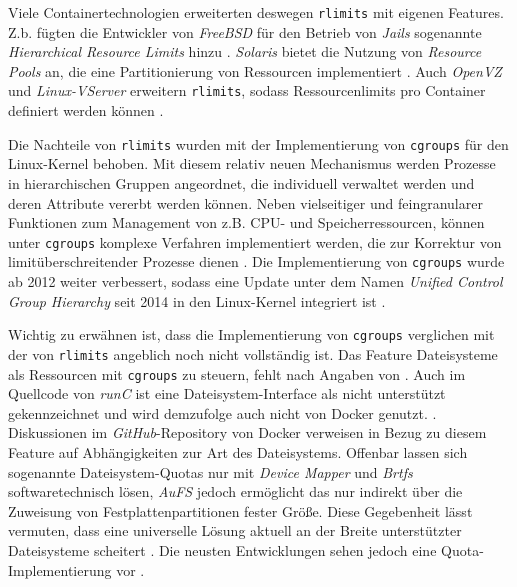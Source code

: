 \documentclass[../main.tex]{subfiles}
\begin{document}

		Viele Containertechnologien erweiterten deswegen \texttt{\acrshort{rlimits}} mit eigenen Features. Z.b. fügten die Entwickler von \emph{FreeBSD} für den Betrieb von \emph{Jails} sogenannte \emph{Hierarchical Resource Limits} hinzu \cite{freeBsdRCTL}. \emph{Solaris} bietet die Nutzung von \emph{Resource Pools} an, die eine Partitionierung von Ressourcen implementiert \cite{cgroupsUniHierarchyDoc}. Auch \emph{OpenVZ} und \emph{Linux-VServer} erweitern \texttt{\acrshort{rlimits}}, sodass Ressourcenlimits pro Container definiert werden können \cite[S.15+16]{dockerSec2}.

		Die Nachteile von \texttt{\acrshort{rlimits}} wurden mit der Implementierung von \texttt{\acrshort{cgroups}} für den Linux-Kernel behoben. Mit diesem relativ neuen Mechanismus werden Prozesse in hierarchischen Gruppen angeordnet, die individuell verwaltet werden und deren Attribute vererbt werden können. Neben vielseitiger und feingranularer Funktionen zum Management von z.B. \acrshort{CPU}- und Speicherressourcen, können unter \texttt{\acrshort{cgroups}} komplexe Verfahren implementiert werden, die zur Korrektur von limitüberschreitender Prozesse dienen \cite{cgroupsRedhat}. Die Implementierung von \texttt{\acrshort{cgroups}} wurde ab 2012 weiter verbessert, sodass eine Update unter dem Namen \emph{Unified Control Group Hierarchy} seit 2014 in den Linux-Kernel integriert ist \cite{cgroupsFixing}\cite{cgroupsUniHierarchy}.

		Wichtig zu erwähnen ist, dass die Implementierung von \texttt{\acrshort{cgroups}} verglichen mit der von \texttt{\acrshort{rlimits}} angeblich noch nicht vollständig ist. Das Feature Dateisysteme als Ressourcen mit \texttt{\acrshort{cgroups}} zu steuern, fehlt nach Angaben von \cite[S.19]{dockerSec2}. Auch im Quellcode von \emph{runC} ist eine Dateisystem-Interface als \glqq{}nicht unterstützt\grqq{} gekennzeichnet und wird demzufolge auch nicht von Docker genutzt. \cite{githubRunCCgroups}. Diskussionen im \emph{GitHub}-Repository von Docker verweisen in Bezug zu diesem Feature auf Abhängigkeiten zur Art des Dateisystems. Offenbar lassen sich sogenannte Dateisystem-Quotas nur mit \emph{Device Mapper} und \emph{Brtfs} softwaretechnisch lösen, \emph{AuFS} jedoch ermöglicht das nur indirekt über die Zuweisung von Festplattenpartitionen fester Größe. Diese Gegebenheit lässt vermuten, dass eine universelle Lösung aktuell an der Breite unterstützter Dateisysteme scheitert \cite{githubDockerIssueFsQuota}. Die neusten Entwicklungen sehen jedoch eine Quota-Implementierung vor \cite{githubDockerPullBrtfs}.
\end{document}
